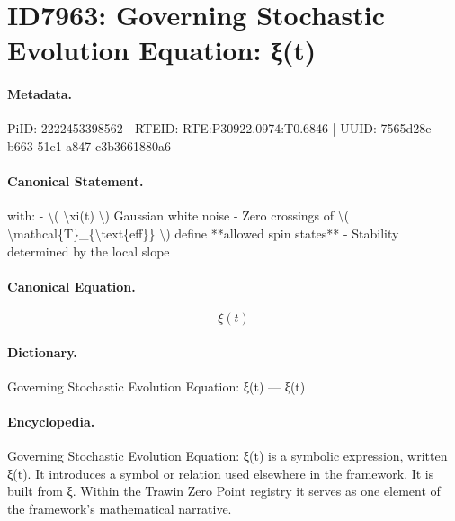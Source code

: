 \section*{ID7963: Governing Stochastic Evolution Equation: ξ(t)}
\paragraph{Metadata.}
PiID: 2222453398562 | RTEID: RTE:P30922.0974:T0.6846 | UUID: 7565d28e-b663-51e1-a847-c3b3661880a6

\paragraph{Canonical Statement.}
with: - \textbackslash{}( \textbackslash{}xi(t) \textbackslash{}) Gaussian white noise - Zero crossings of \textbackslash{}( \textbackslash{}mathcal\{T\}\_\{\textbackslash{}text\{eff\}\} \textbackslash{}) define **allowed spin states** - Stability determined by the local slope

\paragraph{Canonical Equation.}
\[
\xi(t)
\]

\paragraph{Dictionary.}
Governing Stochastic Evolution Equation: ξ(t) — ξ(t)

\paragraph{Encyclopedia.}
Governing Stochastic Evolution Equation: ξ(t) is a symbolic expression, written ξ(t). It introduces a symbol or relation used elsewhere in the framework. It is built from ξ. Within the Trawin Zero Point registry it serves as one element of the framework's mathematical narrative.
